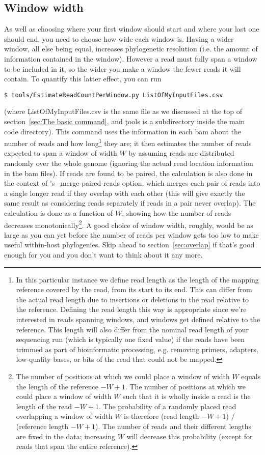 \subsection{Window width} \label{sec:WindowWidth}
As well as choosing where your first window should start and where your last one should end, you need to choose how wide each window is.
Having a wider window, all else being equal, increases phylogenetic resolution (i.e. the amount of information contained in the window).
However a read must fully span a window to be included in it, so the wider you make a window the fewer reads it will contain.
To quantify this latter effect, you can run
\begin{verbatim}
$ tools/EstimateReadCountPerWindow.py ListOfMyInputFiles.csv
\end{verbatim}
(where \c{ListOfMyInputFiles.csv} is the same file as we discussed at the top of section~\ref{sec:The basic command}, and \c{tools} is a subdirectory inside the main \p code directory).
This command uses the information in each bam about the number of reads and how long\footnote{
In this particular instance we define read length as the length of the mapping reference covered by the read, from its start to its end.
This can differ from the actual read length due to insertions or deletions in the read relative to the reference.
Defining the read length this way is appropriate since we're interested in reads spanning windows, and windows get defined relative to the reference.
This length will also differ from the nominal read length of your sequencing run (which is typically one fixed value) if the reads have been trimmed as part of bioinformatic processing, e.g. removing primers, adapters, low-quality bases, or bits of the read that could not be mapped.
} they are; it then estimates the number of reads expected to span a window of width $W$ by assuming reads are distributed randomly over the whole genome (ignoring the actual read location information in the bam files).
If reads are found to be paired, the calculation is also done in the context of \pmt's \c{--merge-paired-reads} option, which merges each pair of reads into a single longer read if they overlap with each other (this will give exactly the same result as considering reads separately if reads in a pair never overlap).
The calculation is done as a function of $W$, showing how the number of reads decreases monotonically\footnote{
The number of positions at which we could place a window of width $W$ equals the length of the reference $- W + 1$.
The number of positions at which we could place a window of width $W$ such that it is wholly inside a read is the length of the read $- W + 1$.
The probability of a randomly placed read overlapping a window of width $W$ is therefore (read length $- W + 1$) / (reference length $- W + 1$).
The number of reads and their different lengths are fixed in the data; increasing $W$ will decrease this probability (except for reads that span the entire reference).}.
A good choice of window width, roughly, would be as large as you can yet before the number of reads per window gets too low to make useful within-host phylogenies.
Skip ahead to section~\ref{sec:overlap} if that's good enough for you and you don't want to think about it any more.

